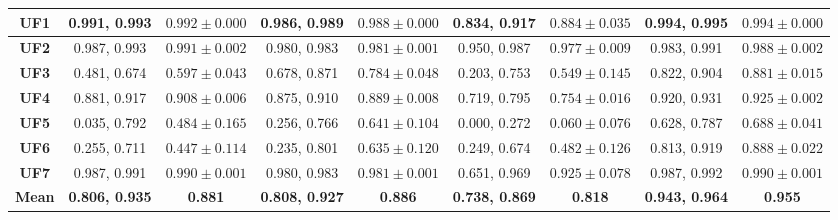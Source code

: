\begin{table*}[t]
\begin{tabular}{c|c|c|c|c|c|c|c|c|}
\multicolumn{1}{|c|}{\textbf{UF1}}   & 0.991, 0.993            & $0.992 \pm 0.000$       & 0.986, 0.989            & $0.988 \pm 0.000$       & 0.834, 0.917            & $0.884 \pm 0.035$       & 0.994, 0.995            & $0.994 \pm 0.000$       \\ \hline
\multicolumn{1}{|c|}{\textbf{UF2}}   & 0.987, 0.993            & $0.991 \pm 0.002$       & 0.980, 0.983            & $0.981 \pm 0.001$       & 0.950, 0.987            & $0.977 \pm 0.009$       & 0.983, 0.991            & $0.988 \pm 0.002$       \\ \hline
\multicolumn{1}{|c|}{\textbf{UF3}}   & 0.481, 0.674            & $0.597 \pm 0.043$       & 0.678, 0.871            & $0.784 \pm 0.048$       & 0.203, 0.753            & $0.549 \pm 0.145$       & 0.822, 0.904            & $0.881 \pm 0.015$       \\ \hline
\multicolumn{1}{|c|}{\textbf{UF4}}   & 0.881, 0.917            & $0.908 \pm 0.006$       & 0.875, 0.910            & $0.889 \pm 0.008$       & 0.719, 0.795            & $0.754 \pm 0.016$       & 0.920, 0.931            & $0.925 \pm 0.002$       \\ \hline
\multicolumn{1}{|c|}{\textbf{UF5}}   & 0.035, 0.792            & $0.484 \pm 0.165$       & 0.256, 0.766            & $0.641 \pm 0.104$       & 0.000, 0.272            & $0.060 \pm 0.076$       & 0.628, 0.787            & $0.688 \pm 0.041$       \\ \hline
\multicolumn{1}{|c|}{\textbf{UF6}}   & 0.255, 0.711            & $0.447 \pm 0.114$       & 0.235, 0.801            & $0.635 \pm 0.120$       & 0.249, 0.674            & $0.482 \pm 0.126$       & 0.813, 0.919            & $0.888 \pm 0.022$       \\ \hline
\multicolumn{1}{|c|}{\textbf{UF7}}   & 0.987, 0.991            & $0.990 \pm 0.001$       & 0.980, 0.983            & $0.981 \pm 0.001$       & 0.651, 0.969            & $0.925 \pm 0.078$       & 0.987, 0.992            & $0.990 \pm 0.001$       \\ \hline
\multicolumn{1}{|c|}{\textbf{Mean}}  & \textbf{0.806, 0.935}   & \textbf{0.881}          & \textbf{0.808, 0.927}   & \textbf{0.886}          & \textbf{0.738, 0.869}   & \textbf{0.818}          & \textbf{0.943, 0.964}   & \textbf{0.955}          \\ \hline
\end{tabular}
\end{table*}
